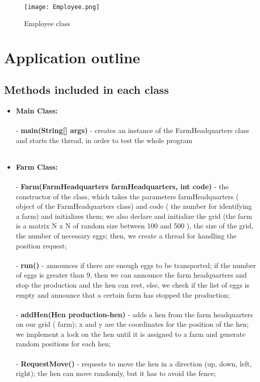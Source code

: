\documentclass{article}
\begin{document}
\begin{figure}[htp]
    \centering
    \texttt{[image: Employee.png]}
    \caption{Employee class}
\end{figure}


\section{Application outline}
\subsection{Methods included in each class}
\begin{itemize}
\item \textbf{Main Class:}  \\ \\
- \textbf{main(String[] args)} - creates an instance of the FarmHeadquarters class and starts the thread, in order to test the whole program \\ \\
\item \textbf{Farm Class:}  \\ \\
- \textbf {Farm(FarmHeadquarters farmHeadquarters, int code)} - the constructor of the class, which takes the parameters farmHeadquarters ( object of the FarmHeadquarters class) and code ( the number for identifying a farm) and initializes them; we also declare and initialize the grid (the farm is a matrix N x N of random size between 100 and 500 ), the size of the grid, the number of necessary eggs; then, we create a thread for handling the position request; \\  \\
- \textbf {run()} - announces if there are enough eggs to be transported; if the number of eggs is greater than 9, then we can announce the 
farm headquarters and  stop the production and the hen can rest, else, we check if the list of eggs is empty and announce that a certain farm has stopped the production;  \\ \\
- \textbf{addHen(Hen production-hen)}  - adds a hen from the farm headquarters on our grid ( farm); x and y are the coordinates for the position of the hen; we implement a lock on the hen until it is assigned to a farm and generate random positions for each hen; \\  \\
- \textbf {RequestMove()} - requests to move the hen in a direction (up, down, 
left, right); the hen can move randomly, but it has to avoid the fence; \\  \\

\end{itemize}
\end{document}
